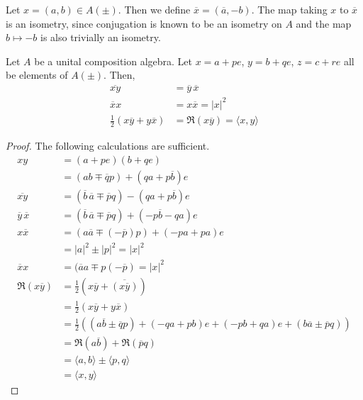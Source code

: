 \begin{defn}
    Let $x=(a,b) \in A(\pm)$. Then we define $\overline{x} =(\overline{a},-b)$. The map taking $x$ to $\overline{x}$ is an isometry, since conjugation is known to be an isometry on $A$ and the map $b\mapsto -b$ is also trivially an isometry.
\end{defn}
\begin{lemma}
    Let $A$ be a unital composition algebra. Let $x = a+pe$, $y= b+qe$, $z = c+re$ all be elements of $A(\pm)$. Then,
    \begin{align*}
        \overline{xy}&=\overline{y}\,\overline{x}\\
        \overline{x}x&=x\overline{x}=|x|^2\\
        \frac{1}{2}(x\overline{y}+y\overline{x}) &= \Re(x\overline{y}) = \langle x,y\rangle 
    \end{align*}
\end{lemma}
\begin{proof}
The following calculations are sufficient.
    \begin{align*}
        xy &= (a+pe)(b+qe)\\
        &= (ab\mp \overline{q}p)+(qa+p\overline{b})e\\
        \overline{xy} &= (\overline{b}\,\overline{a}\mp \overline{p}q)-(qa+p\overline{b})e\\
        \overline{y}\,\overline{x}&=(\overline{b}\,\overline{a}\mp \overline{p}q)+(-p\overline{b}-qa)e\\
        x\overline{x}&=(a\overline{a}\mp(-\overline{p})p)+(-pa+pa)e\\
        &=|a|^2\pm |p|^2 = |x|^2\\
        \overline{x}x&=(\overline{a}a\mp p(-\overline{p})=|x|^2\\
        \Re(x\overline{y})&=\frac{1}{2}(x\overline{y}+\overline{(x\overline{y})})\\
        &= \frac{1}{2}(x\overline{y}+y\overline{x})\\
        &= \frac{1}{2}((a\overline{b}\pm \overline{q}p)+(-qa+pb)e+(-pb+qa)e+(b\overline{a}\pm \overline{p}q))\\
        &= \Re(a\overline{b})+\Re(\overline{p}q)\\
        &= \langle a,b\rangle\pm\langle p,q\rangle\\
        &=\langle x,y\rangle
    \end{align*}
\end{proof}
